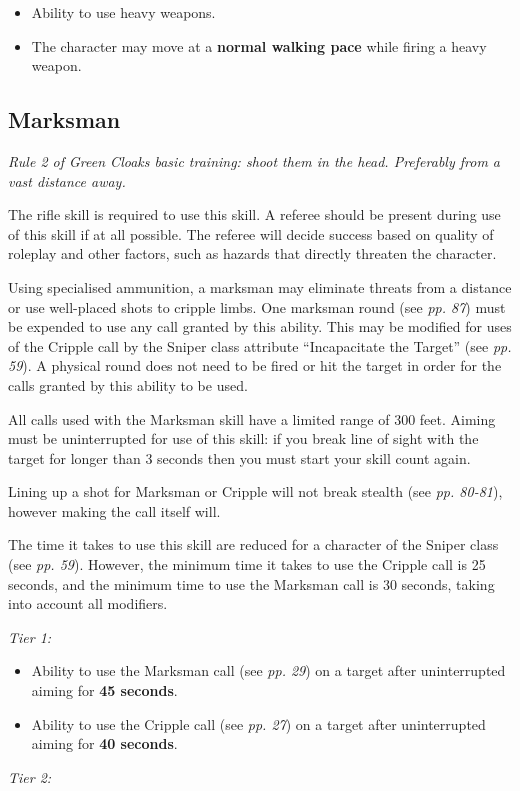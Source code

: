 \documentclass{scrbook}
\begin{document}
\begin{itemize}
\item Ability to use heavy weapons.

\item The character may move at a \textbf{normal walking pace} while firing a heavy weapon.

\end{itemize}
\subsection{Marksman}

\textit{Rule 2 of Green Cloaks basic training: shoot them in the head. Preferably from a vast distance away.}

The rifle skill is required to use this skill. A referee should be present during use of this skill if at all possible. The referee will decide success based on quality of roleplay and other factors, such as hazards that directly threaten the character.

Using specialised ammunition, a marksman may eliminate threats from a distance or use well-placed shots to cripple limbs. One marksman round (see \textit{pp. 87}) must be expended to use any call granted by this ability. This may be modified for uses of the Cripple call by the Sniper class attribute ``Incapacitate the Target'' (see \textit{pp. 59}). A physical round does not need to be fired or hit the target in order for the calls granted by this ability to be used.

All calls used with the Marksman skill have a limited range of 300 feet. Aiming must be uninterrupted for use of this skill: if you break line of sight with the target for longer than 3 seconds then you must start your skill count again.

Lining up a shot for Marksman or Cripple will not break stealth (see \textit{pp. 80-81}), however making the call itself will.

The time it takes to use this skill are reduced for a character of the Sniper class (see \textit{pp. 59}). However, the minimum time it takes to use the Cripple call is 25 seconds, and the minimum time to use the Marksman call is 30 seconds, taking into account all modifiers.

\textit{Tier 1:}

\begin{itemize}
\item Ability to use the Marksman call (see \textit{pp. 29}) on a target after uninterrupted aiming for \textbf{45 seconds}.

\item Ability to use the Cripple call (see \textit{pp. 27}) on a target after uninterrupted aiming for \textbf{40 seconds}.

\end{itemize}
\textit{Tier 2:}
\end{document}
